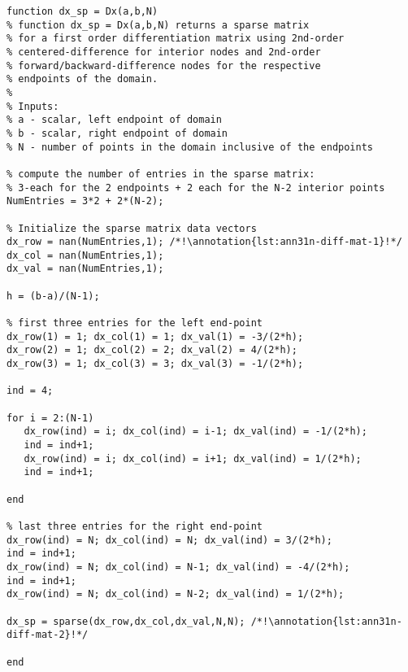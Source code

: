\begin{lstlisting}[style=myMatlab,name=lec31n-yp-mat]
function dx_sp = Dx(a,b,N)
% function dx_sp = Dx(a,b,N) returns a sparse matrix
% for a first order differentiation matrix using 2nd-order
% centered-difference for interior nodes and 2nd-order
% forward/backward-difference nodes for the respective 
% endpoints of the domain.
%
% Inputs:
% a - scalar, left endpoint of domain
% b - scalar, right endpoint of domain
% N - number of points in the domain inclusive of the endpoints

% compute the number of entries in the sparse matrix:
% 3-each for the 2 endpoints + 2 each for the N-2 interior points
NumEntries = 3*2 + 2*(N-2);

% Initialize the sparse matrix data vectors
dx_row = nan(NumEntries,1); /*!\annotation{lst:ann31n-diff-mat-1}!*/
dx_col = nan(NumEntries,1);
dx_val = nan(NumEntries,1);

h = (b-a)/(N-1);

% first three entries for the left end-point
dx_row(1) = 1; dx_col(1) = 1; dx_val(1) = -3/(2*h);
dx_row(2) = 1; dx_col(2) = 2; dx_val(2) = 4/(2*h);
dx_row(3) = 1; dx_col(3) = 3; dx_val(3) = -1/(2*h);

ind = 4;

for i = 2:(N-1)
   dx_row(ind) = i; dx_col(ind) = i-1; dx_val(ind) = -1/(2*h);
   ind = ind+1;
   dx_row(ind) = i; dx_col(ind) = i+1; dx_val(ind) = 1/(2*h);
   ind = ind+1;   
    
end

% last three entries for the right end-point
dx_row(ind) = N; dx_col(ind) = N; dx_val(ind) = 3/(2*h);
ind = ind+1;
dx_row(ind) = N; dx_col(ind) = N-1; dx_val(ind) = -4/(2*h);
ind = ind+1;
dx_row(ind) = N; dx_col(ind) = N-2; dx_val(ind) = 1/(2*h);

dx_sp = sparse(dx_row,dx_col,dx_val,N,N); /*!\annotation{lst:ann31n-diff-mat-2}!*/

end
\end{lstlisting}

